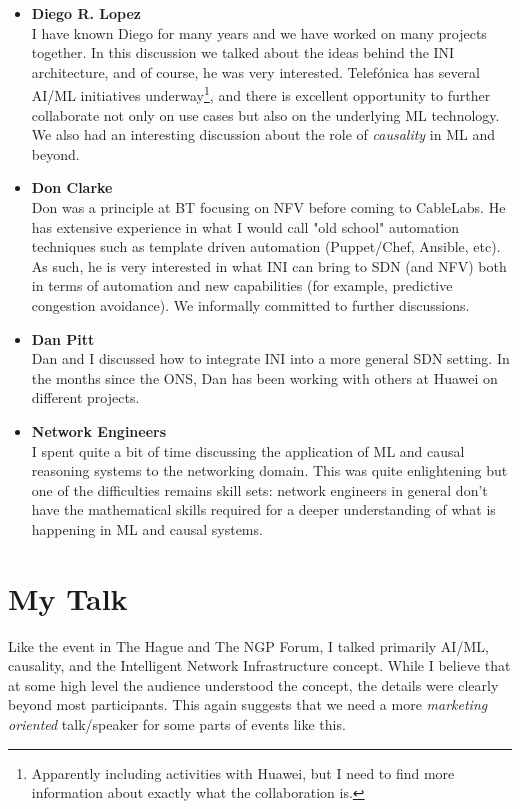 \documentclass[11pt, oneside]{article}   	%
\begin{document}
\begin{itemize}
\item \textbf{Diego R. Lopez} \\
I have known Diego for many years and we have worked on many projects together. In this discussion we talked
about the ideas behind the INI architecture, and of course, he was very interested. Telef\'onica has several AI/ML 
initiatives underway\footnote{Apparently including activities with Huawei, but I need to find more information about
exactly what the collaboration is.}, and there is excellent opportunity to further collaborate not only on use cases but
also on the underlying ML technology. We also had an interesting discussion about the role of \emph{causality} in ML and
beyond.

\item \textbf{Don Clarke} \\
Don was a principle at BT focusing on NFV before coming to CableLabs. He has extensive experience in what I would call "old school" automation techniques such as template driven automation (Puppet/Chef, Ansible, etc).  As such, he is very interested in what INI can bring to SDN (and NFV)  both in terms of automation and new capabilities (for example, predictive congestion avoidance).  We informally committed to further discussions. 

\item \textbf{Dan Pitt} \\
Dan and I discussed how to integrate INI into a more general SDN setting. In the months since the ONS, Dan has been working with others at Huawei on different projects.

\item \textbf{Network Engineers} \\
I spent quite a bit of time discussing the application of ML and causal reasoning systems to the networking domain. This was quite enlightening but one of the difficulties remains skill sets: network engineers
in general don't have the mathematical skills required for a deeper understanding of what is happening in ML and causal systems.

\end{itemize}


\section{My Talk} 
\label{sec:my_talk}
Like the event in The Hague and The NGP Forum, I talked primarily AI/ML, causality, and the Intelligent Network Infrastructure concept. While I believe that at some high level the audience understood the concept, the details were clearly beyond most participants. This again suggests that we need a more \emph{marketing oriented} talk/speaker for some parts of events like this. 
\end{document}
